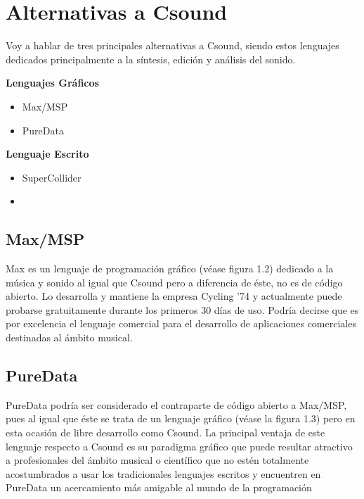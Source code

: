 \section{Alternativas a Csound}\label{sec:intro}

Voy a hablar de tres principales alternativas a Csound, siendo estos lenguajes dedicados principalmente a la síntesis, edición y análisis del sonido.\bigskip

\textbf{Lenguajes Gráficos}		
\begin{itemize}
    \item Max/MSP
    \item PureData
\end{itemize}

\textbf{Lenguaje Escrito} 
\begin{itemize}
    \item SuperCollider
    \item[\vspace{\fill}]
\end{itemize}

\subsection{Max/MSP}
Max es un lenguaje de programación gráfico (véase figura 1.2) dedicado a la música y sonido al igual que Csound pero a diferencia de éste, no es de código abierto. Lo desarrolla y mantiene la empresa Cycling '74 y actualmente puede probarse gratuitamente durante los primeros 30 días de uso.
Podría decirse que es por excelencia el lenguaje comercial para el desarrollo de aplicaciones comerciales destinadas al ámbito musical.

\subsection{PureData}
PureData podría ser considerado el contraparte de código abierto a Max/MSP, pues al igual que éste se trata de un lenguaje gráfico (véase la figura 1.3) pero en esta ocasión de libre desarrollo como Csound.
La principal ventaja de este lenguaje respecto a Csound es su paradigma gráfico que puede resultar atractivo a profesionales del ámbito musical o científico que no estén totalmente acostumbrados a usar los tradicionales lenguajes escritos y encuentren en PureData un acercamiento más amigable al mundo de la programación

